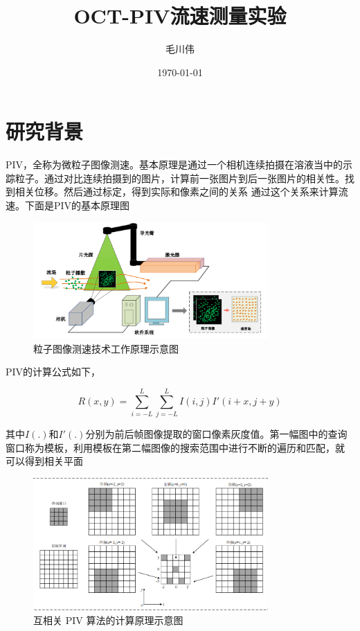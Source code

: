 \documentclass[12pt]{article}
\title{OCT-PIV流速测量实验}
\author{毛川伟}
\date{\today}
\begin{document}
\maketitle

\section{研究背景}

PIV，全称为微粒子图像测速。基本原理是通过一个相机连续拍摄在溶液当中的示踪粒子。通过对比连续拍摄到的图片，计算前一张图片到后一张图片的相关性。找到相关位移。然后通过标定，得到实际和像素之间的关系
通过这个关系来计算流速。下面是PIV的基本原理图

\begin{figure}[h]
    \centering
    \includegraphics[width=0.8\textwidth]{Images/PIV_principles.png}
    \caption{粒子图像测速技术工作原理示意图}
    
    
\end{figure}

PIV的计算公式如下，


    \begin{equation}
        R(x,y)=\sum_{i=-L}^L\sum_{j=-L}^LI(i,j)I'(i+x,j+y)
    \end{equation}

    其中$I(.)$和$I'(.)$分别为前后帧图像提取的窗口像素灰度值。第一幅图中的查询窗口称为模板，利用模板在第二幅图像的搜索范围中进行不断的遍历和匹配，就
    可以得到相关平面

    \begin{figure}
        \centering
        \includegraphics[width=0.8\textwidth]{Images/互相关算法示意图.png}
        \caption{互相关 PIV 算法的计算原理示意图}
        
        
    \end{figure}
\end{document}
